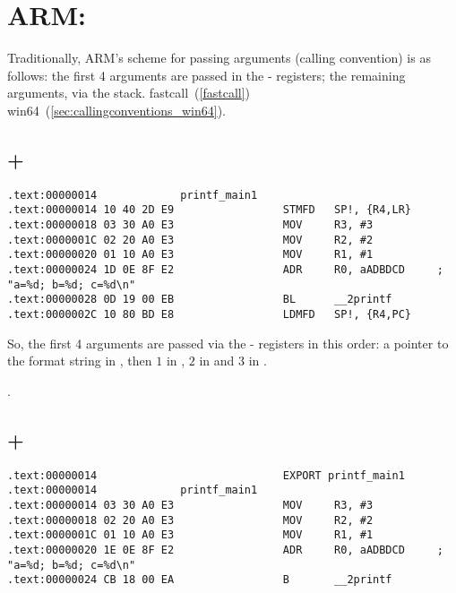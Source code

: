 \section{ARM: }

{Traditionally, ARM's scheme for passing arguments (calling convention) is as follows:
the first 4 arguments are passed in the - registers; the remaining arguments, via the stack}.
fastcall~(\ref{fastcall}) \OrENRU win64~(\ref{sec:callingconventions_win64}).

\subsection{\NonOptimizingKeil + \ARMMode}

\begin{lstlisting}[caption=\NonOptimizingKeil + \ARMMode]
.text:00000014             printf_main1
.text:00000014 10 40 2D E9                 STMFD   SP!, {R4,LR}
.text:00000018 03 30 A0 E3                 MOV     R3, #3
.text:0000001C 02 20 A0 E3                 MOV     R2, #2
.text:00000020 01 10 A0 E3                 MOV     R1, #1
.text:00000024 1D 0E 8F E2                 ADR     R0, aADBDCD     ; "a=%d; b=%d; c=%d\n"
.text:00000028 0D 19 00 EB                 BL      __2printf
.text:0000002C 10 80 BD E8                 LDMFD   SP!, {R4,PC}
\end{lstlisting}

{So, the first 4 arguments are passed via the - registers in this order:
a pointer to the \printf format string in 
, then $1$ in , $2$ in  and $3$ in }.

.

\subsection{\OptimizingKeil + \ARMMode}
\label{ARM_B_to_printf}

\begin{lstlisting}[caption=\OptimizingKeil + \ARMMode]
.text:00000014                             EXPORT printf_main1
.text:00000014             printf_main1
.text:00000014 03 30 A0 E3                 MOV     R3, #3
.text:00000018 02 20 A0 E3                 MOV     R2, #2
.text:0000001C 01 10 A0 E3                 MOV     R1, #1
.text:00000020 1E 0E 8F E2                 ADR     R0, aADBDCD     ; "a=%d; b=%d; c=%d\n"
.text:00000024 CB 18 00 EA                 B       __2printf
\end{lstlisting}

